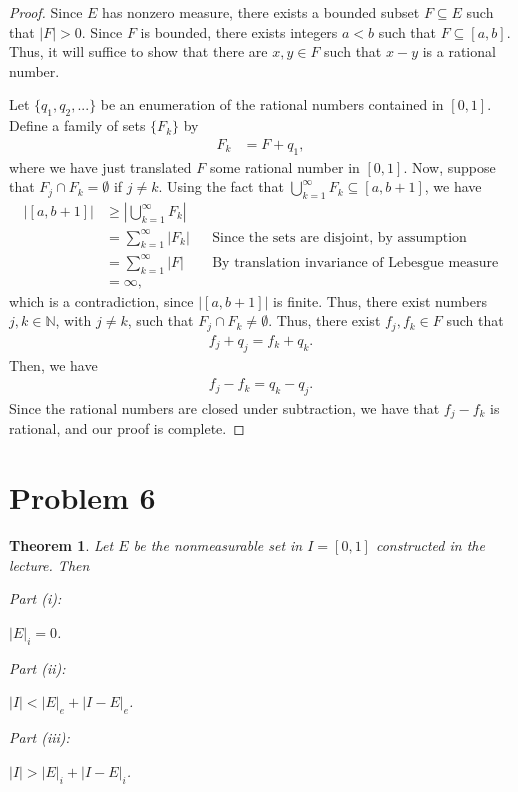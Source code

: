\documentclass[10pt,a4paper]{article}
\makeatletter
\theoremstyle{theorem}
\newtheorem{theorem}{Theorem}
\newcommand{\proofpart}[2]{%
  \par
  \addvspace{\medskipamount}%
  \noindent\emph{Part #1: #2}\par\nobreak
  \addvspace{\smallskipamount}%
  \@afterheading
}
\theoremstyle{definition}
\makeatother
\begin{document}
\begin{proof}
Since $E$ has nonzero measure, there exists a bounded subset $F \subseteq E$ such that $|F| > 0$.  Since $F$ is bounded, there exists integers $a < b$ such that $F \subseteq [a, b]$. Thus, it will suffice to show that there are $x,y \in F$ such that $x - y$ is a rational number.

Let $\{q_1, q_2,...\}$ be an enumeration of the rational numbers contained in $[0, 1]$. Define a family of sets $\{F_k\}$ by 
\begin{align*}
F_k &= F + q_1,
\end{align*}
where we have just translated $F$ some rational number in $[0, 1]$. Now, suppose that $F_j \cap F_k = \emptyset$ if $j \not = k$.  Using the fact that $\bigcup_{k=1}^\infty F_k \subseteq [a, b + 1]$, we have
\begin{align*}
|[a, b+1]| &\geq | \bigcup_{k=1}^\infty F_k|\\
&= \sum_{k=1}^\infty |F_k| && \text{Since the sets are disjoint, by assumption}\\
&= \sum_{k=1}^\infty |F| &&\text{By translation invariance of Lebesgue measure}\\
&= \infty, 
\end{align*}
which is a contradiction, since $|[a, b+1]|$ is finite. Thus,  there exist numbers $j, k \in \mathbb{N}$, with $j \not = k$,  such that $F_j \cap F_k \not = \emptyset$. Thus, there exist $f_j,f_k \in F$ such that 
\begin{align*}
f_j + q_j = f_k + q_k.
\end{align*}
Then, we have
\begin{align*}
f_j - f_k = q_k - q_j.
\end{align*}
Since the rational numbers are closed under subtraction, we have that $f_j - f_k$ is rational, and our proof is complete.
\end{proof}

\section*{Problem 6}
\begin{theorem}
Let $E$ be the nonmeasurable set in $I = [0, 1]$ constructed in the lecture. Then
\proofpart{(i)}{}
$|E|_i = 0$.

\proofpart{(ii)}{}
$|I| < |E|_e + |I - E|_e$.

\proofpart{(iii)}{}
$|I| > |E|_i + |I - E|_i$.
\end{theorem}
\end{document}
